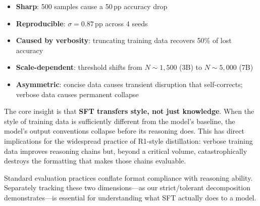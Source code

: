 \documentclass{article}
\begin{document}
\begin{itemize}
    \item \textbf{Sharp}: 500 samples cause a 50\,pp accuracy drop
    \item \textbf{Reproducible}: $\sigma = 0.87$\,pp across 4 seeds
    \item \textbf{Caused by verbosity}: truncating training data recovers 50\% of lost accuracy
    \item \textbf{Scale-dependent}: threshold shifts from $N{\sim}1{,}500$ (3B) to $N{\sim}5{,}000$ (7B)
    \item \textbf{Asymmetric}: concise data causes transient disruption that self-corrects; verbose data causes permanent collapse
\end{itemize}

The core insight is that \textbf{SFT transfers style, not just knowledge}. When the style of training data is sufficiently different from the model's baseline, the model's output conventions collapse before its reasoning does. This has direct implications for the widespread practice of R1-style distillation: verbose training data improves reasoning chains but, beyond a critical volume, catastrophically destroys the formatting that makes those chains evaluable.

Standard evaluation practices conflate format compliance with reasoning ability. Separately tracking these two dimensions---as our strict/tolerant decomposition demonstrates---is essential for understanding what SFT actually does to a model.


\end{document}
